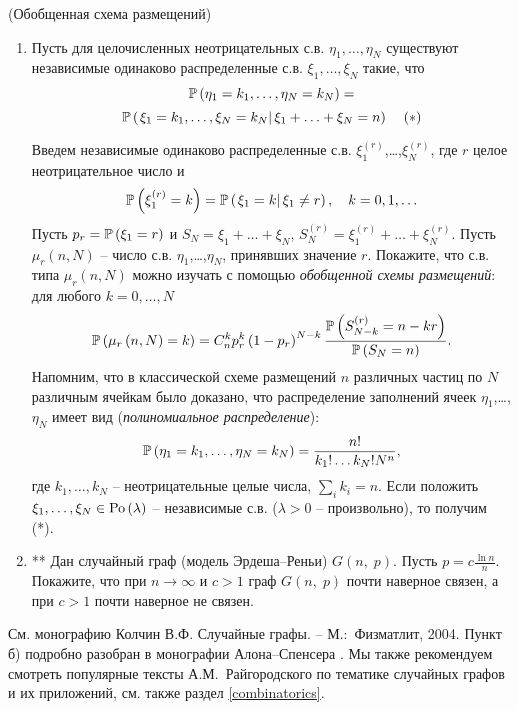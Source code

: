  
\begin{problem}(Обобщенная схема размещений)
\noindent
\begin{enumerate}
\item  Пусть для целочисленных  неотрицательных с.в. $\eta _1,\ldots,\eta _N$ существуют независимые одинаково распределенные с.в. 
$\xi_1,\ldots,\xi_N$ такие, что
\[ 
\mathrm{{\mathbb P}}\left( {\eta _1 =k_1,\ldots,\eta _N =k_N } \right) =  \]\[ \mathrm{{\mathbb P}}\left( {\left. {\xi _1 
=k_1 ,\ldots,\xi _N =k_N } \right|\xi _1 +\ldots+\xi _N =n} \right) \;\;\;\; (*) \]
 
Введем независимые одинаково распределенные с.в. $\xi _1^{\left( r \right)} 
$,{\ldots},$\xi _N^{\left( r \right)} $, где $r$ целое неотрицательное число 
и
\[
\mathrm{{\mathbb P}}\left( {\xi _1^{\left( r \right)} =k} \right)=\mathrm{{\mathbb P}}\left( {\left. {\xi _1 =k} 
\right|\xi _1 \ne r} \right),
\quad
k=0,1,\ldots
\]
Пусть $p_r = \mathrm{{\mathbb P}}\left( {\xi _1 =r} \right)$ и $S_N =\xi _1 +\ldots+\xi _N$,
$S_N^{\left( r \right)} =\xi _1^{\left( r \right)} +\ldots+\xi _N^{\left( r \right)} $. Пусть $\mu _r \left( {n,N} \right)$ -- число с.в. $\eta _1$,{\ldots},$\eta_N $, принявших значение $r$. Покажите, что с.в. типа $\mu_r \left( {n,N} \right)$ можно изучать с помощью \textit{обобщенной схемы размещений}: для любого $k=0,\ldots,N$
\[
\mathrm{{\mathbb P}}\left( {\mu _r \left( {n,N} \right)=k} \right)=C_n^k p_r^k \left( {1-p_r } 
\right)^{N-k}\frac{\mathrm{{\mathbb P}}\left( {S_{N-k}^{\left( r \right)} =n-kr} 
\right)}{\mathrm{{\mathbb P}}\left( {S_N =n} \right)}.
\]
Напомним, что в классической схеме размещений $n$ различных частиц по $N$ 
различным ячейкам было доказано, что распределение заполнений ячеек $\eta _1 
$,{\ldots},$\eta _N $ имеет вид (\textit{полиномиальное распределение}):
\[
\mathrm{{\mathbb P}}\left( {\eta _1 =k_1 ,\ldots,\eta _N =k_N } \right)=\frac{n!}{k_1!\ldots k_N! N^n},
\]
где $k_1,\ldots,k_N$ -- неотрицательные целые числа, $\sum_{i} k_i =n$. Если положить $\xi_1,\ldots,\xi_N \in \mathrm{Po} \left( \lambda 
\right)$ -- независимые с.в. ($\lambda >0$ -- произвольно), то получим (*).
 
\item ** Дан случайный граф (модель Эрдеша--Реньи) $G\left( {n,\;p} \right)$. Пусть 
$p=c\frac{\ln n}{n}$. Покажите, что при $n\to\infty$ и $c>1$ граф $G\left( {n,\;p} \right)$ 
почти наверное связен, а при $c>1$ почти наверное не связен.
 
 
\end{enumerate}
\begin{remark}
См. монографию Колчин В.Ф. Случайные графы. -- М.:~Физматлит, 2004. Пункт б) подробно разобран в монографии Алона--Спенсера \cite{15}. Мы также рекомендуем смотреть популярные тексты А.М.~Райгородского по тематике случайных графов и их приложений, см. также раздел
\ref{combinatorics}.
\end{remark}
\end{problem}


